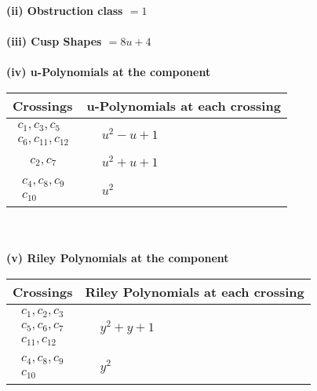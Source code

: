 \documentclass[1p]{elsarticle_modified}
\theoremstyle{definition}
\begin{document}
\flushleft \textbf{(ii) Obstruction class $= 1$}\\~\\
\flushleft \textbf{(iii) Cusp Shapes $= 8 u+4$}\\~\\
\newpage\renewcommand{\arraystretch}{1}
\flushleft \textbf{(iv) u-Polynomials at the component}\newline \\
\begin{tabular}{m{50pt}|m{274pt}}
Crossings & \hspace{64pt}u-Polynomials at each crossing \\
\hline $$\begin{aligned}c_{1},c_{3},c_{5}\\c_{6},c_{11},c_{12}\end{aligned}$$&$\begin{aligned}
&u^2- u+1
\end{aligned}$\\
\hline $$\begin{aligned}c_{2},c_{7}\end{aligned}$$&$\begin{aligned}
&u^2+u+1
\end{aligned}$\\
\hline $$\begin{aligned}c_{4},c_{8},c_{9}\\c_{10}\end{aligned}$$&$\begin{aligned}
&u^2
\end{aligned}$\\
\hline
\end{tabular}\\~\\
\newpage\renewcommand{\arraystretch}{1}
\flushleft \textbf{(v) Riley Polynomials at the component}\newline \\
\begin{tabular}{m{50pt}|m{274pt}}
Crossings & \hspace{64pt}Riley Polynomials at each crossing \\
\hline $$\begin{aligned}c_{1},c_{2},c_{3}\\c_{5},c_{6},c_{7}\\c_{11},c_{12}\end{aligned}$$&$\begin{aligned}
&y^2+y+1
\end{aligned}$\\
\hline $$\begin{aligned}c_{4},c_{8},c_{9}\\c_{10}\end{aligned}$$&$\begin{aligned}
&y^2
\end{aligned}$\\
\hline
\end{tabular}\\~\\
\end{document}
